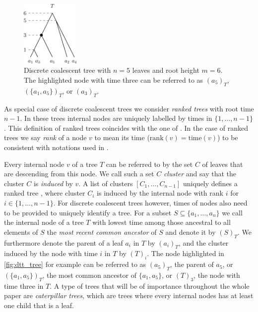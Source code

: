 \documentclass[11pt]{amsart}
\newcommand{\rank}{\mathrm{rank}}
\newcommand{\ntime}{\mathrm{time}}
\begin{document}
\begin{figure}[ht]
	\includegraphics[width=0.25\textwidth]{dtt_tree.eps}
	\caption{Discrete coalescent tree with $n = 5$ leaves and root height $m = 6$.
	The highlighted node with time three can be referred to as $(a_5)_T$, $(\{a_1,a_5\})_T$, or $(a_3)_T$.}
	\label{fig:dtt_tree}
\end{figure}

As special case of discrete coalescent trees we consider \emph{ranked trees} with root time $n-1$.
In these trees internal nodes are uniquely labelled by times in $\{1, \ldots, n-1\}$.
This definition of ranked trees coincides with the one of \textcite{Collienne2020-iu}.
In the case of ranked trees we say \emph{rank} of a node $v$ to mean its time ($\rank(v) = \ntime(v)$) to be consistent with notations used in \autocite{Collienne2020-iu}.

Every internal node $v$ of a tree $T$ can be referred to by the set $C$ of leaves that are descending from this node.
We call such a set $C$ \emph{cluster} and say that the cluster $C$ is \emph{induced} by $v$.
A list of clusters $[C_1, \ldots, C_{n-1}]$ uniquely defines a ranked tree \autocite{Collienne2020-iu}, where cluster $C_i$ is induced by the internal node with rank $i$ for $i \in \{1, \ldots, n-1\}$.
For discrete coalescent trees however, times of nodes also need to be provided to uniquely identify a tree.
For a subset $S \subseteq \{a_1, \ldots, a_n\}$ we call the internal node of a tree $T$ with lowest time among those ancestral to all elements of $S$ the \emph{most recent common ancestor} of $S$ and denote it by $(S)_T$.
We furthermore denote the parent of a leaf $a_i$ in $T$ by $(a_i)_T$, and the cluster induced by the node with time $i$ in $T$ by $(T)_i$.
The node highlighted in \autoref{fig:dtt_tree} for example can be referred to as $(a_5)_T$, the parent of $a_5$, or $(\{a_1, a_5\})_T$, the most common ancestor of $\{a_1, a_5\}$, or $(T)_3$, the node with time three in $T$.
A type of trees that will be of importance throughout the whole paper are \emph{caterpillar trees}, which are trees where every internal nodes has at least one child that is a leaf.
\end{document}
